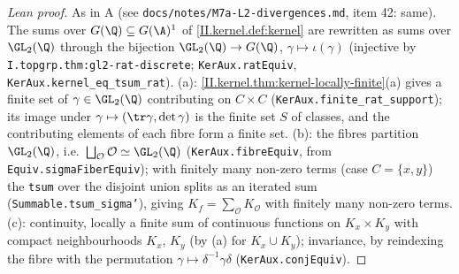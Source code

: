 \begin{proof}[Lean proof]
As in A (see \texttt{docs/notes/M7a-L2-divergences.md}, item 42: same). The sums over $G(\Q)\subseteq G(\A)^1$ of \cref{II.kernel.def:kernel} are rewritten as sums over $\GL_2(\Q)$ through the bijection $\GL_2(\Q)\to G(\Q)$, $\gamma\mapsto\iota(\gamma)$ (injective by \texttt{I.topgrp.thm:gl2-rat-discrete}; \texttt{KerAux.ratEquiv}, \texttt{KerAux.kernel\_eq\_tsum\_rat}). (a): \cref{II.kernel.thm:kernel-locally-finite}(a) gives a finite set of $\gamma\in\GL_2(\Q)$ contributing on $C\times C$ (\texttt{KerAux.finite\_rat\_support}); its image under $\gamma\mapsto(\tr\gamma,\det\gamma)$ is the finite set $S$ of classes, and the contributing elements of each fibre form a finite set. (b): the fibres partition $\GL_2(\Q)$, i.e.\ $\bigsqcup_{\mathcal O}\mathcal O\simeq\GL_2(\Q)$ (\texttt{KerAux.fibreEquiv}, from \texttt{Equiv.sigmaFiberEquiv}); with finitely many non-zero terms (case $C=\{x,y\}$) the \texttt{tsum} over the disjoint union splits as an iterated sum (\texttt{Summable.tsum\_sigma'}), giving $K_f=\sum_{\mathcal O}K_{\mathcal O}$ with finitely many non-zero terms. (c): continuity, locally a finite sum of continuous functions on $K_x\times K_y$ with compact neighbourhoods $K_x$, $K_y$ (by (a) for $K_x\cup K_y$); invariance, by reindexing the fibre with the permutation $\gamma\mapsto\delta^{-1}\gamma\delta$ (\texttt{KerAux.conjEquiv}).
\end{proof}

